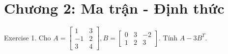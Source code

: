 \documentclass[12pt]{report}
\begin{document}
\section*{Chương 2: Ma trận - Định thức}

Exercise 1. Cho $A = \begin{bmatrix}
	1 & 3 \\ -1 & 2 \\ 3 & 4
\end{bmatrix}, B = \begin{bmatrix} 0 & 3 & -2 \\ 1 & 2 & 3 \end{bmatrix}$. 
Tính $A - 3B^T$.
\end{document}
